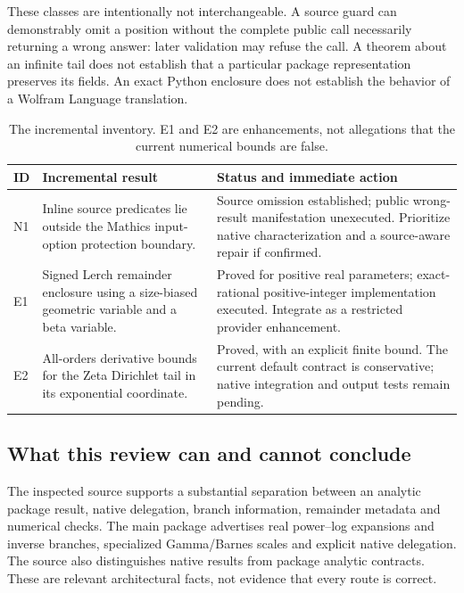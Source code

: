 \documentclass[11pt,a4paper]{article}
\begin{document}
These classes are intentionally not interchangeable. A source guard can demonstrably omit a position without the complete public call necessarily returning a wrong answer: later validation may refuse the call. A theorem about an infinite tail does not establish that a particular package representation preserves its fields. An exact Python enclosure does not establish the behavior of a Wolfram Language translation.

\begin{table}[htbp]
\centering\small
\begin{tabularx}{\textwidth}{@{}p{0.8cm}p{3.9cm}X@{}}
\toprule
ID & Incremental result & Status and immediate action\\
\midrule
N1 & Inline source predicates lie outside the Mathics input-option protection boundary. & Source omission established; public wrong-result manifestation unexecuted. Prioritize native characterization and a source-aware repair if confirmed.\\
E1 & Signed Lerch remainder enclosure using a size-biased geometric variable and a beta variable. & Proved for positive real parameters; exact-rational positive-integer implementation executed. Integrate as a restricted provider enhancement.\\
E2 & All-orders derivative bounds for the Zeta Dirichlet tail in its exponential coordinate. & Proved, with an explicit finite bound. The current default contract is conservative; native integration and output tests remain pending.\\
\bottomrule
\end{tabularx}
\caption{The incremental inventory. E1 and E2 are enhancements, not allegations that the current numerical bounds are false.}
\end{table}

\subsection{What this review can and cannot conclude}
The inspected source supports a substantial separation between an analytic package result, native delegation, branch information, remainder metadata and numerical checks. The main package advertises real power--log expansions and inverse branches, specialized Gamma/Barnes scales and explicit native delegation. The source also distinguishes native results from package analytic contracts. These are relevant architectural facts, not evidence that every route is correct.\cite{core,nativecompat}
\end{document}
